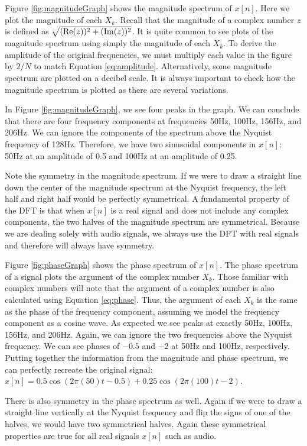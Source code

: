 Figure \ref{fig:magnitudeGraph} shows the magnitude spectrum of $x[n]$.  Here we plot the magnitude of
each $X_k$.  Recall that the magnitude of a complex number $z$ is defined as $\sqrt{(\mathrm{Re}(z))^2 + (\mathrm{Im}(z))^2}$.
It is quite common to see plots of the magnitude spectrum
using simply the magnitude of each $X_k$.  To derive the amplitude of the original frequencies, we must multiply
each value in the figure by $2/N$ to match Equation \ref{eq:amplitude}.  
Alternatively, some magnitude spectrum are plotted on a decibel scale.  It is always important to
check how the magnitude spectrum is plotted as there are several variations.

	In Figure \ref{fig:magnitudeGraph}, we see four peaks in the graph.  We can conclude that there are four 
frequency components at frequencies 50Hz, 100Hz, 156Hz, and 206Hz.  
We can ignore the components of the spectrum above the Nyquist frequency of 128Hz. 
Therefore, we have two
sinusoidal components in $x[n]$: 50Hz at an amplitude of 0.5 and 100Hz at an amplitude of 0.25.  

Note the symmetry in the magnitude spectrum.  If we were to draw a straight line down the center of the 
magnitude spectrum at the Nyquist frequency, the left half and right half would be perfectly symmetrical.  
A fundamental property of the DFT is that when $x[n]$ is a real signal and does not include any complex
components, the two halves of the magnitude spectrum are symmetrical.  Because we are dealing solely 
with audio signals,
we always use the DFT with real signals and therefore will always have symmetry.  

Figure \ref{fig:phaseGraph} shows the phase spectrum of $x[n]$.  The phase spectrum of a signal plots
the argument of the complex number $X_k$.  Those familiar with complex numbers will note that
 the argument of a complex number is also calculated 
using Equation \ref{eq:phase}.  Thus, the argument of each $X_k$ is the same as the phase of
the frequency component, assuming we model the frequency component 
as a cosine wave.  As expected we see peaks at exactly 50Hz, 100Hz, 156Hz, and 206Hz.  Again, we can 
ignore the two frequencies above the Nyquist frequency.  We can see phases of $-0.5$ and $-2$ at 50Hz and 
100Hz, respectively.  Putting together the information from the magnitude and
phase spectrum, we can perfectly recreate the original signal: 
$x[n] = 0.5\cos(2\pi(50)t - 0.5) + 0.25\cos(2\pi(100)t - 2)$.

There is also symmetry in the phase spectrum as well.  Again if we were to draw a straight line vertically at
the Nyquist frequency and flip the signs of one of the halves, we would have two symmetrical halves.  Again
these symmetrical properties are true for all real signals $x[n]$ such as audio.
